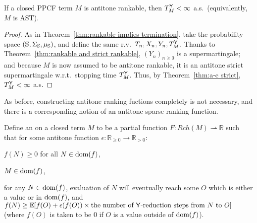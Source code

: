 
\begin{therm} \label{thm:antitone rankable implies termination}
If a closed PPCF term $M$ is antitone rankable, then $T_M^{\mathsf{Y}} < \infty$ a.s.~(equivalently, $M$ is AST).
\end{therm}
\begin{proof}
As in %
Theorem~\ref{thm:rankable implies termination},
take the probability space $({\mathbb{S}}, \Sigma_{\mathbb{S}}, \mu_{\mathbb{S}})$, and define the same r.v.~$T_n, X_n, Y_n, T_M^{\mathsf{Y}}$. 
Thanks to Theorem~\ref{thm:rankable and strict rankable}, $(Y_n)_{n \geq 0}$ is a supermartingale; and because $M$ is now assumed to be antitone rankable, it is an antitone strict supermartingale w.r.t.~stopping time $T_M^{\mathsf{Y}}$. 
Thus, by Theorem~\ref{thm:a-c strict}, $T_M^{\mathsf{Y}} < \infty$ a.s.
\end{proof}

As before, constructing antitone ranking fuctions completely is not necessary, and there is a corresponding notion of an antitone sparse ranking function.

\begin{definition}\rm
Define an  on a closed term $M$ to be a partial function $F : Rch(M) \rightharpoonup \mathbb{R}$ such that for some antitone function $\epsilon : \mathbb{R}_{\geq 0} \to \mathbb{R}_{>0}$:
\begin{asparaenum}[(i)]
\item $f(N) \geq 0$ for all $N \in \operatorname{dom}(f)$,
\item $M \in \operatorname{dom}(f)$,
\item for any $N \in \operatorname{dom}(f)$, evaluation of $N$ will eventually reach some $O$ which is either a value or in $\operatorname{dom}(f)$, and $f(N) \geq \mathbb E [f(O) + \epsilon(f(O)) \times \text{the number of $\mathsf{Y}$-reduction steps from $N$ to $O$}]$ (where $f(O)$ is taken to be 0 if $O$ is a value outside of $\operatorname{dom}(f)$).
\end{asparaenum}
\end{definition}

